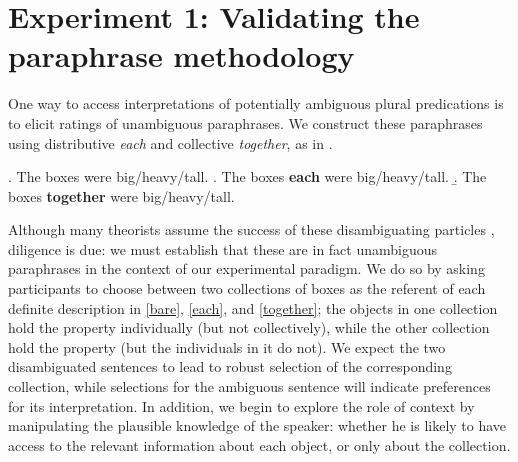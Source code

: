 \documentclass[preprint,12pt,authoryear,titlepage]{elsarticle}
\begin{document}
%

\section{Experiment 1: Validating the paraphrase methodology}

One way to access interpretations of potentially ambiguous plural predications is to elicit ratings of unambiguous paraphrases. We construct these paraphrases using distributive \emph{each} and collective \emph{together}, as in \Next.

\ex. \label{bare}The boxes were big/heavy/tall.
\a.\label{each} The boxes \textbf{each} were big/heavy/tall.
\b.\label{together} The boxes \textbf{together} were big/heavy/tall.

Although many theorists assume the success of these disambiguating particles \citep[e.g.,][]{schwarzschild1994}, diligence is due: we must establish that these are in fact unambiguous paraphrases in the context of our experimental paradigm. We do so by asking participants to choose between two collections of boxes as the referent of each definite description in \ref{bare}, \ref{each}, and \ref{together}; the objects in one collection hold the property individually (but not collectively), while the other collection hold the property (but the individuals in it do not).
We expect the two disambiguated sentences to lead to robust selection of the corresponding collection, while selections for the ambiguous sentence will indicate preferences for its interpretation.
In addition, we begin to explore the role of context by manipulating the plausible knowledge of the speaker: whether he is likely to have access to the relevant information about each object, or only about the collection.
\end{document}
